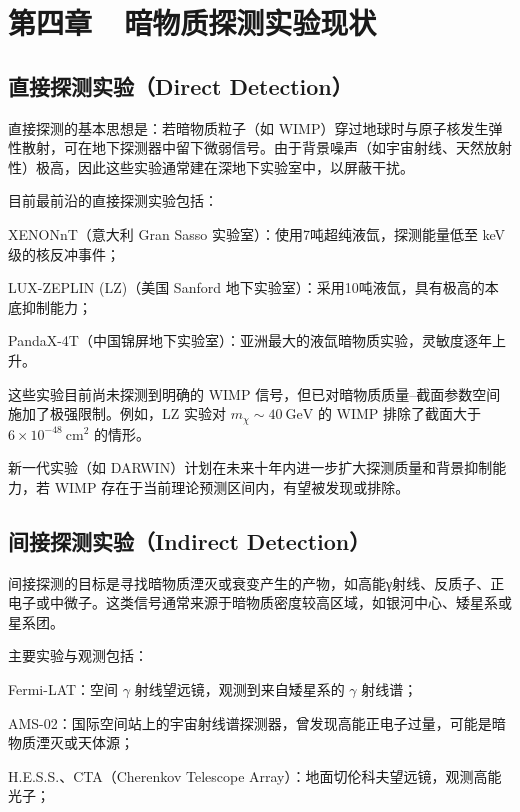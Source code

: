 \section*{第四章~~暗物质探测实验现状}

\setcounter{section}{4} \setcounter{subsection}{0}
\setcounter{table}{0} \setcounter{figure}{0} \setcounter{equation}{0}


\subsection{直接探测实验（Direct Detection）}

直接探测的基本思想是：若暗物质粒子（如 WIMP）穿过地球时与原子核发生弹性散射，可在地下探测器中留下微弱信号。由于背景噪声（如宇宙射线、天然放射性）极高，因此这些实验通常建在深地下实验室中，以屏蔽干扰。

目前最前沿的直接探测实验包括：

XENONnT（意大利 Gran Sasso 实验室）：使用7吨超纯液氙，探测能量低至 keV 级的核反冲事件；

LUX-ZEPLIN (LZ)（美国 Sanford 地下实验室）：采用10吨液氙，具有极高的本底抑制能力；

PandaX-4T（中国锦屏地下实验室）：亚洲最大的液氙暗物质实验，灵敏度逐年上升。

这些实验目前尚未探测到明确的 WIMP 信号，但已对暗物质质量–截面参数空间施加了极强限制。例如，LZ 实验对 $m_\chi\sim 40~\mathrm{GeV} $ 的 WIMP 排除了截面大于 $6\times 10^{-48}~\mathrm{cm}^2$ 的情形。

新一代实验（如 DARWIN）计划在未来十年内进一步扩大探测质量和背景抑制能力，若 WIMP 存在于当前理论预测区间内，有望被发现或排除。

\subsection{间接探测实验（Indirect Detection）}

间接探测的目标是寻找暗物质湮灭或衰变产生的产物，如高能γ射线、反质子、正电子或中微子。这类信号通常来源于暗物质密度较高区域，如银河中心、矮星系或星系团。

主要实验与观测包括：

Fermi-LAT：空间 $\gamma$ 射线望远镜，观测到来自矮星系的 $\gamma$ 射线谱；

AMS-02：国际空间站上的宇宙射线谱探测器，曾发现高能正电子过量，可能是暗物质湮灭或天体源；

H.E.S.S.、CTA（Cherenkov Telescope Array）：地面切伦科夫望远镜，观测高能光子；

